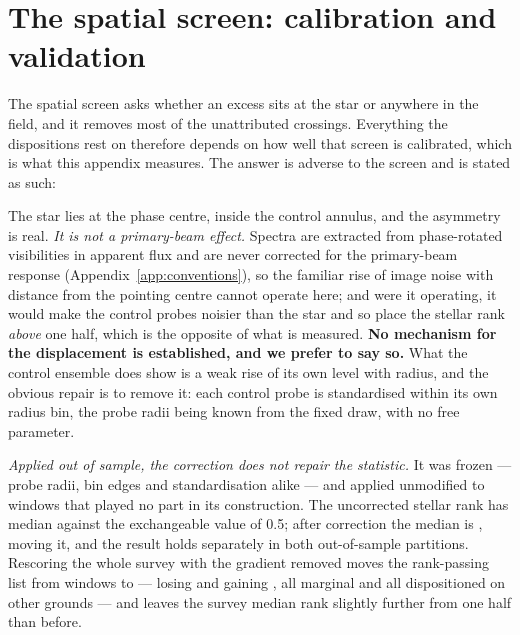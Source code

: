 \section{The spatial screen: calibration and validation}
\label{app:radius}

The spatial screen asks whether an excess sits at the star or anywhere in the
field, and it removes most of the unattributed crossings. Everything the
dispositions rest on therefore depends on how well that screen is
calibrated, which is what this appendix measures. The answer is adverse to
the screen and is stated as such: \rankstatus{}

The star lies at the phase centre, inside the control annulus, and the
asymmetry is real. \emph{It is not a primary-beam effect.} Spectra are
extracted from phase-rotated visibilities in apparent flux and are never
corrected for the primary-beam response
(Appendix~\ref{app:conventions}), so the familiar rise of image noise with
distance from the pointing centre cannot operate here; and were it
operating, it would make the control probes noisier than the star and so
place the stellar rank \emph{above} one half, which is the opposite of what
is measured. \textbf{No mechanism for the displacement is established, and
we prefer to say so.} What the control ensemble does show is a weak rise of
its own level with radius, and the obvious repair is to remove it: each
control probe is standardised within its own radius bin, the probe radii
being known from the fixed draw, with no free parameter.

\emph{Applied out of sample, the correction does not repair the statistic.}
It was frozen --- probe radii, bin edges and standardisation alike --- and
applied unmodified to \RadValStarN{} windows that played no part in its
construction. The uncorrected stellar rank has median \RadValStarRawMed{}
against the exchangeable value of 0.5; after correction the median is
\RadValStarCorMed, moving \RadValStarToward{} it, and the result holds
separately in both out-of-sample partitions. Rescoring the whole survey with
the gradient removed moves the rank-passing list from \LocStageGlobal{}
windows to \LocStageLocal{} --- losing \LocStageLost{} and gaining
\LocStageGained, all marginal and all dispositioned on other grounds --- and
leaves the survey median rank slightly further from one half than before.

